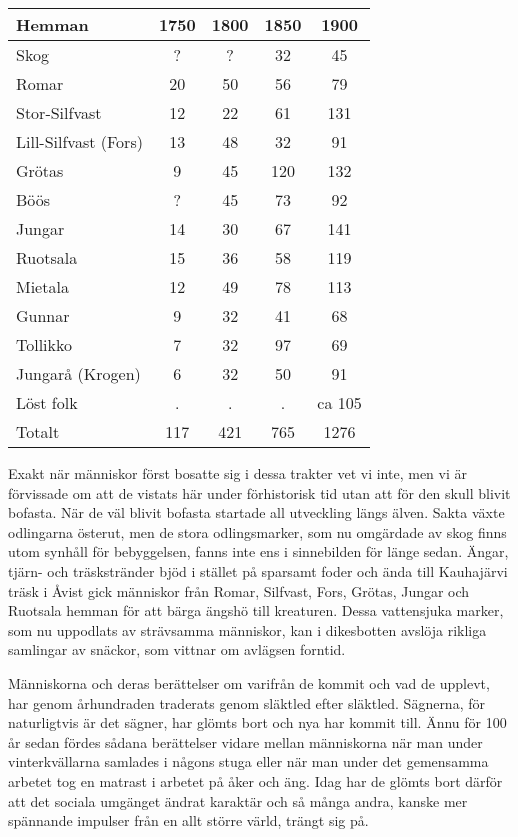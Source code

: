 \begin{center}
  \begin{tabular}{lcccc}
    \hline
    Hemman & 1750 & 1800 & 1850 & 1900 \\ \hline
    Skog & ? & ? & 32 & 45 \\
    Romar & 20 & 50 & 56 & 79 \\
    Stor-Silfvast & 12 & 22 & 61 & 131 \\
    Lill-Silfvast (Fors) & 13 & 48 & 32 & 91 \\
    Grötas & 9 & 45 & 120 & 132 \\
    Böös & ? & 45 & 73 & 92 \\
    Jungar & 14 & 30 & 67 & 141 \\
    Ruotsala & 15 & 36 & 58 & 119 \\
    Mietala & 12 & 49 & 78 & 113 \\
    Gunnar & 9 & 32 & 41 & 68 \\
    Tollikko & 7 & 32 & 97 & 69 \\
    Jungarå (Krogen) & 6 & 32 & 50 & 91 \\
    Löst folk & . & . & . & ca 105 \\ \hline
    Totalt & 117 & 421 & 765 & 1276 \\
    \hline
  \end{tabular}
\end{center}

%

Exakt när människor först bosatte sig i dessa trakter vet vi inte, men vi är förvissade om att de vistats här under förhistorisk tid utan att för den skull blivit bofasta. När de väl blivit bofasta startade all utveckling längs älven. Sakta växte odlingarna österut, men de stora odlingsmarker, som nu omgärdade av skog finns utom synhåll för bebyggelsen, fanns inte ens i sinnebilden för länge sedan. Ängar, tjärn- och träskstränder bjöd i stället på sparsamt foder och ända till Kauhajärvi träsk i Åvist gick människor från Romar, Silfvast, Fors, Grötas, Jungar och Ruotsala hemman för att bärga ängshö till kreaturen. Dessa vattensjuka marker, som nu uppodlats av strävsamma människor, kan i dikesbotten avslöja rikliga samlingar av snäckor, som vittnar om avlägsen forntid.


Människorna och deras berättelser om varifrån de kommit och vad de upplevt, har genom århundraden traderats genom släktled efter släktled. Sägnerna, för naturligtvis är det sägner, har glömts bort och nya har kommit till. Ännu för 100 år sedan fördes sådana berättelser vidare mellan människorna när man under vinterkvällarna samlades i någons stuga eller när man under det gemensamma arbetet tog en matrast i arbetet på åker och äng. Idag har de glömts bort därför att det sociala umgänget ändrat karaktär och så många andra, kanske mer spännande impulser från en allt större värld, trängt sig på.




